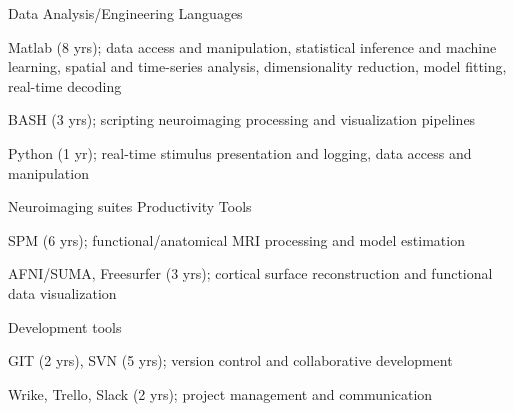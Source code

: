 \vspace*{-0.25cm}

\vspace*{0.3cm}

\begin{cventries}

\cventry
    {Data Analysis/Engineering} %
    {Languages} %
    {\vspace*{-0.05cm}}
    {\vspace*{-0.05cm}} %
    {
      \begin{cvitems} %
        \item {Matlab (8 yrs); data access and manipulation, statistical inference and machine learning, spatial and time-series analysis, dimensionality reduction, model fitting, real-time decoding}
        \item {BASH (3 yrs); scripting neuroimaging processing and visualization pipelines}
        \item {Python (1 yr); real-time stimulus presentation and logging, data access and manipulation}
      \end{cvitems}
    }
    \vspace*{0.1cm}

\cventry
    {Neuroimaging suites} %
    {Productivity Tools} %
    {\vspace*{-0.05cm}}
    {\vspace*{-0.05cm}} %
    {
      \begin{cvitems} %
        \item {SPM (6 yrs); functional/anatomical MRI processing and model estimation}
        \item {AFNI/SUMA, Freesurfer (3 yrs); cortical surface reconstruction and functional data visualization}
      \end{cvitems}
    }
    \vspace*{-0.2cm}
\cventry
	{Development tools}
	{\vspace*{-0.05cm}}
    {\vspace*{-0.05cm}}
    {\vspace*{-0.05cm}} %
    {
      \begin{cvitems} %
      	\item {GIT (2 yrs), SVN (5 yrs); version control and collaborative development}
      	\item {Wrike, Trello, Slack (2 yrs); project management and communication}
      \end{cvitems}
    }
    \vspace*{-0.2cm}
\end{cventries}
